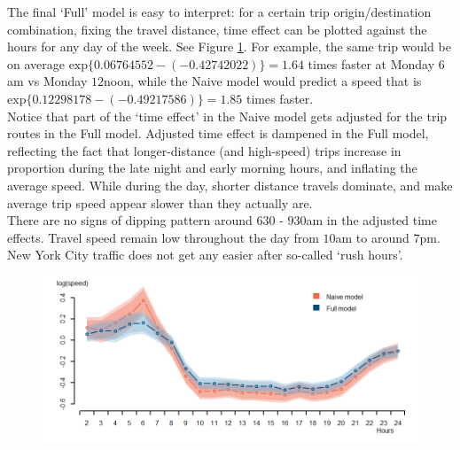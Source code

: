 \documentclass[10pt,a4paper]{article} %
\begin{document}
{    The final `Full' model is easy to interpret: for a certain trip origin/destination combination, fixing the travel distance, time effect can be plotted against the hours for any day of the week. See Figure \ref{fig:effect}. For example, the same trip would be on average $\mathrm{exp}\{0.06764552-(-0.42742022)\}=1.64$ times faster at Monday $6$am vs Monday $12$noon, while the Naive model would predict a speed that is $\mathrm{exp}\{0.12298178-(-0.49217586)\}=1.85$ times faster.\\
    
    Notice that part of the `time effect' in the Naive model gets adjusted for the trip routes in the Full model. Adjusted time effect is dampened in the Full model, reflecting the fact that longer-distance (and high-speed) trips increase in proportion during the late night and early morning hours, and inflating the average speed. While during the day, shorter distance travels dominate, and make average trip speed appear slower than they actually are.\\
    
    There are no signs of dipping pattern around $630$ - $930$am in the adjusted time effects. Travel speed remain low throughout the day from $10$am to around $7$pm. New York City traffic does not get any easier after so-called `rush hours'.\\
    
    \begin{figure}
    \centering
        \includegraphics[width=\linewidth]{effect.png}
        \label{fig:effect}
    \end{figure}
    
}
\end{document}
